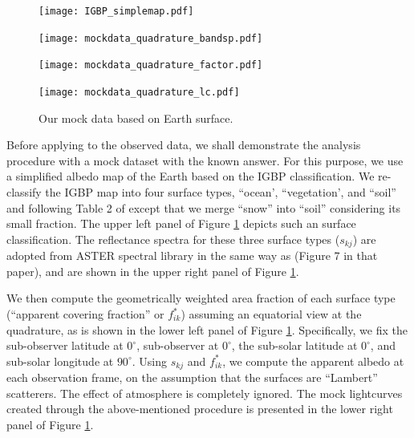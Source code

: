 \documentclass[iop,numberedappendix,apj,]{emulateapj}
\begin{document}
\begin{figure}[bth!]
    \begin{minipage}{0.5\hsize}
    \begin{center}
\texttt{[image: IGBP\_simplemap.pdf]}
    \end{center}
     \end{minipage}
  \begin{minipage}{0.5\hsize}
    \begin{center}
    \texttt{[image: mockdata\_quadrature\_bandsp.pdf]}
    \end{center}
\end{minipage}
  \begin{minipage}{0.5\hsize}
    \begin{center}
\texttt{[image: mockdata\_quadrature\_factor.pdf]}
    \end{center}
 \end{minipage}
   \begin{minipage}{0.5\hsize}
    \begin{center}
\texttt{[image: mockdata\_quadrature\_lc.pdf]}
    \end{center}
 \end{minipage}
    \caption{Our mock data based on Earth surface. }
\label{fig:mockdata}
\end{figure}

Before applying to the observed data, we shall demonstrate the analysis procedure with a mock dataset with the known answer. 
For this purpose, we use a simplified albedo map of the Earth based on the IGBP classification. 
We re-classify the IGBP map into four surface types, ``ocean', ``vegetation', and ``soil'' and following Table 2 of \citet{Fujii2010} except that we merge ``snow'' into ``soil'' considering its small fraction. 
The upper left panel of Figure \ref{fig:mockdata} depicts such an surface classification. 
The reflectance spectra for these three surface types ($s_{kj}$) are adopted from ASTER spectral library \citep{Baldridge2009} in the same way as \citet{Fujii2010} (Figure 7 in that paper), and are shown in the upper right panel of Figure \ref{fig:mockdata}. 

We then compute the geometrically weighted area fraction of each surface type (``apparent covering fraction'' or $f^{\ast }_{ik}$) assuming an equatorial view at the quadrature, as is shown in the lower left panel of Figure \ref{fig:mockdata}. 
Specifically, we fix the sub-observer latitude at $0^{\circ }$, sub-observer at $0^{\circ }$, the sub-solar latitude at $0^{\circ }$, and sub-solar longitude at $90^{\circ }$. 
Using $s_{kj}$ and $f^{\ast }_{ik}$, we compute the apparent albedo at each observation frame, on the assumption that the surfaces are ``Lambert'' scatterers. The effect of atmosphere is completely ignored. 
The mock lightcurves created through the above-mentioned procedure is presented in the lower right panel of Figure \ref{fig:mockdata}. 
\end{document}
